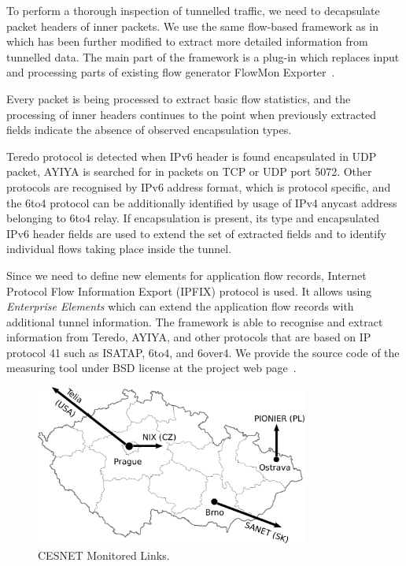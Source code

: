 To perform a thorough inspection of tunnelled traffic, we need to decapsulate packet headers of inner packets. We use the same flow-based framework as in~\cite{Elich-2011-Monitoring} which has been further modified to extract more detailed information from tunnelled data. The main part of the framework is a plug-in which replaces input and processing parts of existing flow generator FlowMon Exporter~\cite{FlowmonNetworks--Flowmon}. 

Every packet is being processed to extract basic flow statistics, and the processing of inner headers continues to the point when previously extracted fields indicate the absence of observed encapsulation types.

Teredo protocol is detected when IPv6 header is found encapsulated in UDP packet, AYIYA is searched for in packets on TCP or UDP port 5072. Other protocols are recognised by IPv6 address format, which is protocol specific, and the 6to4 protocol can be additionally identified by usage of IPv4 anycast address belonging to 6to4 relay. If encapsulation is present, its type and encapsulated IPv6 header fields are used to extend the set of extracted fields and to identify individual flows taking place inside the tunnel. 

Since we need to define new elements for application flow records, Internet Protocol Flow Information Export (IPFIX) protocol is used. It allows using \emph{Enterprise Elements} which can extend the application flow records with additional tunnel information. 
The framework is able to recognise and extract information from Teredo, AYIYA, and other protocols that are based on IP protocol 41 such as ISATAP, 6to4, and 6over4. 
We provide the source code of the measuring tool under BSD license at the project web page~\cite{Elich-2013-FlowMon}.

\begin{figure}[!tb]
\centering
\includegraphics[width=0.8\textwidth]{figures/paper-tunnels/cesnet-map}
\caption{CESNET Monitored Links.}
\label{fig:ipv6-tunnels-topology}
\end{figure}

